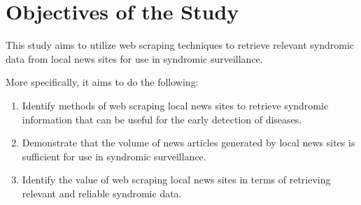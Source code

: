 \section{Objectives of the Study}

This study aims to utilize web scraping techniques to retrieve relevant syndromic data from local news sites for use in syndromic surveillance.

More specifically, it aims to do the following:
\begin{enumerate}
\item Identify methods of web scraping local news sites to retrieve syndromic information that can be useful for the early detection of diseases.
\item Demonstrate that the volume of news articles generated by local news sites is sufficient for use in syndromic surveillance. 
\item Identify the value of web scraping local news sites in terms of retrieving relevant and reliable syndromic data.
\end{enumerate}